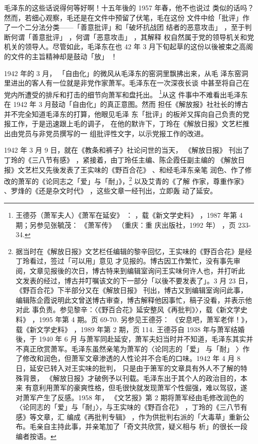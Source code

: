 毛泽东的这些话说得何等好啊！十五年後的 1957 年春，他不也说过
类似的话吗？然而，若细心观察，毛还是在文件中预留了伏笔，毛在这份
文件中给「批评」作了一个二分法分类——「善意批评」和「破坏抗战团
结者的恶意攻击」
，至于判断何谓「善意批评」
，何谓「恶意攻击」
，其解释
权自然属于党的领导机关和党机关的领导人。尽管如此，毛泽东在也 42
年 3 月下旬起草的这份以後被束之高阁的文件的主旨精神却是鼓动「放」
！

1942 年的 3 月，
「自由化」的微风从毛泽东的窑洞里飘拂出来，从毛
泽东窑洞里进出的客人有一位就是非党作家萧军。毛泽东在一次深夜长谈
中甚至将自己在党内所遭受的排斥和打击的细节向萧军和盘托出。
\footnote{王德芬（萧军夫人）《萧军在延安》
：
，载《新文学史料》
，1987 年第 4 期；另参见张毓茂：
《萧军传》
（重庆：重
庆出版社，1992 年）
，页 233-34.}从这
件事中不难看出毛泽东在 1942 年 3 月鼓动「自由化」的真正意图。然而
担任《解放报》社社长的博古并不完全知道毛泽东的打算，他眼见毛泽
东「批评」的板斧又挥向自己负责的党报工作，于是迅速跟上毛的调子，
在他的默许下，丁玲在《解放日报》文艺栏推出由党员与非党员撰写的一
组批评性文字，以示党报工作的改进。

1942 年 3 月 9 日，就在《教条和裤子》社论问世的当天，
《解放日报》
刊出了丁玲的《三八节有感》
，紧接着，由丁玲任主编、陈企霞任副主编的
《解放日报》文艺栏又先後发表了王实味的《野百合花》
、和经毛泽东亲笔
润色、作了修改的萧军的《论同志之「爱」与「耐」》，\footnote{据当时在《解放日报》文艺栏任编辑的黎辛回忆，王实味的《野百合花》是经丁玲看过，签过「可以用」意见
才见报的。博古因工作繁忙，没有事先审阅，文章见报後的次日，博古特来到编辑室询问王实味何许人也，并打听此
文发表的经过，博古并叮嘱该文的下一部分「以後不要发表了」。3 月 23 日，
《野百合花》下半部分又在《解放日报》
刊出，博古又到编辑室询问此事，编辑陈企霞说明此文曾送博古审查，博古解释他因事忙，稿子没看，并表示他对此
事负责。参见黎辛：〈《野百合花》延安整风《再批判》〉，载《新文学史料》
，1995 年第 4 期。页 69-70. 另参见王德芬：
《安息吧，萧军老伴！》，载《新文学史料》
，1989 年第 2 期，页 114. 王德芬自 1938 年与萧军结婚後，于 1940 年 6 月
与萧军同赴延安，萧军夫妇当时并不知道，毛泽东其实并不真正欣赏萧军。毛泽东虽然亲笔为萧军的〈论同志的「爱」
与「耐」
〉作了修改和润色，但萧军文章渗透的人性论并不合毛的口味。1942 年 4 月 8 日，延安已转入对王实味的批判，
只是由于箫军的文章具有外人不了解的特殊背景，
《解放日报》才破例予以刊载。毛泽东出于其个人的政治目的，本来
有意利用萧军的豪爽性格，但毛很快就发现萧军个性倔强，难以驾驭，遂对萧军产生了反感。1958 年，
《文艺报》第 2
期将萧军经由毛修改润色的〈论同志的「爱」与「耐」〉，与王实味的《野百合花》
，丁玲的《三八节有感》等文章，汇
编成《再批判专辑》
，作为供批判右派的「大毒草」重新公布。毛亲自主持此事，并亲笔加了「奇文共欣赏，疑义相与
析」的很长一段编者按语。
} 以及艾青的《了解
作家，尊重作家》
、罗烽的《还是杂文时代》
，这些文章一经刊出，立即轰
动了延安。


